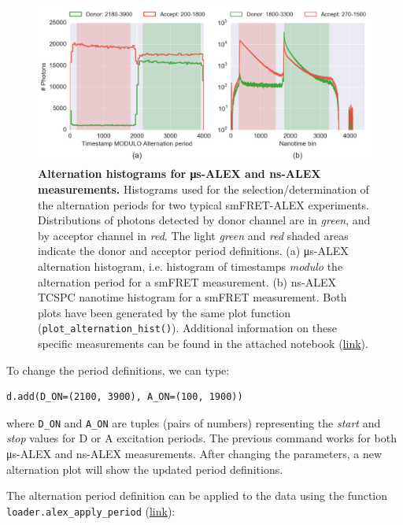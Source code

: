 \documentclass[10pt,letterpaper]{article}
\begin{document}
\begin{figure}[h!]
\begin{center}
\includegraphics[width=1\columnwidth]{figures/ALEX_alternation_double/ALEX_alternation_double}
\caption{\label{fig:altern_hist_double}
\textbf{Alternation histograms for μs-ALEX and ns-ALEX measurements.}
Histograms used for the selection/determination
of the alternation periods for two typical smFRET-ALEX experiments.
Distributions of photons detected by donor channel are in \textit{green},
and by acceptor channel in \textit{red}.
The light \textit{green} and \textit{red} shaded areas indicate the donor
and acceptor period definitions.
(a) μs-ALEX alternation histogram, i.e. histogram of timestamps \textit{modulo}
the alternation period for a smFRET measurement.
(b) ns-ALEX TCSPC nanotime histogram for a smFRET measurement.
Both plots have been generated by the same plot function
(\texttt{plot\_alternation\_hist()}).
Additional information on these specific measurements can be found in the
attached notebook
(\href{http://nbviewer.jupyter.org/github/tritemio/fretbursts_paper/blob/master/notebooks/Figures\%20-\%20ALEX\%20histograms.ipynb}{link}).%
}
\end{center}
\end{figure}


To change the period definitions, we can type:

\begin{lstlisting}
d.add(D_ON=(2100, 3900), A_ON=(100, 1900))
\end{lstlisting}

where \verb|D_ON| and \verb|A_ON| are tuples (pairs of numbers) representing
the \textit{start} and \textit{stop} values for D or A excitation periods.
The previous command works for both μs-ALEX and ns-ALEX measurements.
After changing the parameters, a new alternation plot will show the updated
period definitions.

The alternation period definition can be applied to the data
using the function \verb|loader.alex_apply_period|
(\href{http://fretbursts.readthedocs.org/en/latest/loader.html#fretbursts.loader.alex_apply_period}{link}):
\end{document}
